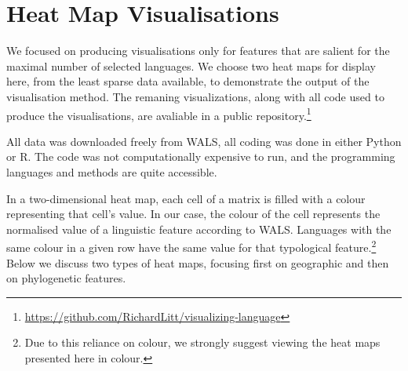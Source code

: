 \documentclass[11pt]{article}
\begin{document}
\section{Heat Map Visualisations}

We focused on producing visualisations only for features that are salient for the maximal number of selected languages. We choose two heat maps for display here, from the least sparse data available, to demonstrate the output of the visualisation method. The remaning visualizations, along with all code used to produce the visualisations, are avaliable in a public repository.\footnote{\url{https://github.com/RichardLitt/visualizing-language}}

All data was downloaded freely from WALS, all coding was done in either Python or R. The code was not computationally expensive to run, and the programming languages and methods are quite accessible. 

In a two-dimensional heat map, each cell of a matrix is filled with a colour representing that cell's value. In our case, the colour of the cell represents the normalised value of a linguistic feature according to WALS. Languages with the same colour in a given row have the same value for that typological feature.\footnote{Due to this reliance on colour, we strongly suggest viewing the heat maps presented here in colour.} Below we discuss two types of heat maps, focusing first on geographic and then on phylogenetic features.
\end{document}
